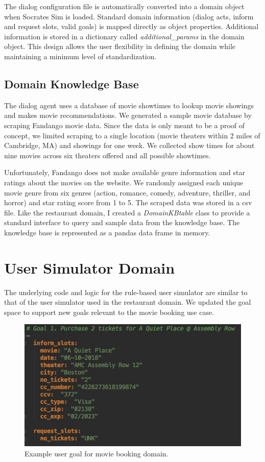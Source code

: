 The dialog configuration file is automatically converted into a domain object when Socrates Sim is loaded. Standard domain information (dialog acts, inform and request slots, valid goals) is mapped directly as object properties. Additional information is stored in a dictionary called \textit{additional\_params} in the domain object. This design allows the user flexibility in defining the domain while maintaining a minimum level of standardization. 

\subsection{Domain Knowledge Base}

The dialog agent uses a database of movie showtimes to lookup movie showings and makes movie recommendations. We generated a sample movie database by scraping Fandango movie data. Since the data is only meant to be a proof of concept, we limited scraping to a single location (movie theaters within 2 miles of Cambridge, MA) and showings for one week. We collected show times for about nine movies across six theaters offered and all possible showtimes. 

Unfortunately, Fandango does not make available genre information and star ratings about the movies on the website. We randomly assigned each unique movie genre from six genres (action, romance, comedy, adventure, thriller, and horror) and star rating score from 1 to 5. The scraped data was stored in a csv file. Like the restaurant domain, I created a \textit{DomainKBtable} class to provide a standard interface to query and sample data from the knowledge base. The knowledge base is represented as a pandas data frame in memory. 

\section{User Simulator Domain}

The underlying code and logic for the rule-based user simulator are similar to that of the user simulator used in the restaurant domain. We updated the goal space to support new goals relevant to the movie booking use case.

\begin{figure}[h!]
	\centering
	\includegraphics[scale=.25]{diagrams/sample_movie_goal.jpeg}
	\caption{ Example user goal for movie booking domain.}
	\label{fig:movie_goal}
\end{figure}

